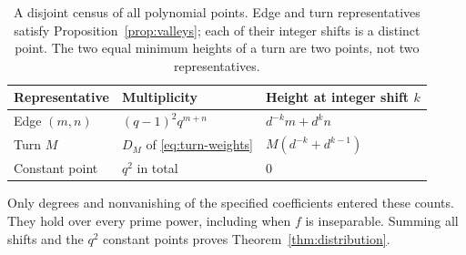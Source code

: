 \begin{table}[htbp]
\centering\small
\begin{tabular}{@{}lll@{}}
\toprule
Representative & Multiplicity & Height at integer shift $k$\\
\midrule
Edge $(m,n)$ & $(q-1)^2q^{m+n}$ & $d^{-k}m+d^kn$\\
Turn $M$ & $D_M$ of \eqref{eq:turn-weights} & $M(d^{-k}+d^{k-1})$\\
Constant point & $q^2$ in total & $0$\\
\bottomrule
\end{tabular}
\caption{A disjoint census of all polynomial points. Edge and turn
representatives satisfy Proposition~\ref{prop:valleys}; each of
their integer shifts is a distinct point. The two equal minimum
heights of a turn are two points, not two representatives.}
\label{tab:valleys}
\end{table}

Only degrees and nonvanishing of the specified coefficients entered
these counts. They hold over every prime power, including when
$f$ is inseparable. Summing all shifts and the $q^2$ constant
points proves Theorem~\ref{thm:distribution}.
